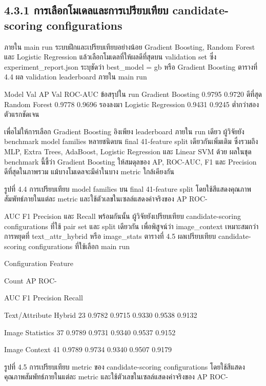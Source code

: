 \documentclass[12pt,a4paper]{report}
\begin{document}
\subsection*{4.3.1 การเลือกโมเดลและการเปรียบเทียบ candidate-scoring configurations}
ภายใน main run ระบบฝึกและเปรียบเทียบอย่างน้อย Gradient Boosting, Random Forest และ Logistic Regression แล้วเลือกโมเดลที่ให้ผลดีที่สุดบน validation set ซึ่ง experiment\_report.json ระบุชัดว่า best\_model = gb หรือ Gradient Boosting ตารางที่ 4.4 ผล validation leaderboard ภายใน main run\par
Model Val AP Val ROC-AUC ข้อสรุปใน run Gradient Boosting 0.9795 0.9720 ดีที่สุด Random Forest 0.9778 0.9696 รองลงมา Logistic Regression 0.9431 0.9245 ต่ำกว่าสองตัวแรกชัดเจน\par
\clearpage
เพื่อไม่ให้การเลือก Gradient Boosting อิงเพียง leaderboard ภายใน run เดียว ผู้วิจัยยัง benchmark model families หลายชนิดบน final 41-feature split เดียวกันเพิ่มเติม ซึ่งรวมถึง MLP, Extra Trees, AdaBoost, Logistic Regression และ Linear SVM ด้วย ผลในชุด benchmark นี้ชี้ว่า Gradient Boosting ให้สมดุลของ AP, ROC-AUC, F1 และ Precision ดีที่สุดในภาพรวม แม้บางโมเดลจะมีค่าในบาง metric ใกล้เคียงกัน\par
\begin{center}\small รูปที่ 4.4 การเปรียบเทียบ model families บน final 41-feature split โดยใช้สีแสดงคุณภาพสัมพัทธ์ภายในแต่ละ metric และใช้ตัวเลขในเซลล์แสดงค่าจริงของ AP ROC-\end{center}
AUC F1 Precision และ Recall พร้อมกันนั้น ผู้วิจัยยังเปรียบเทียบ candidate-scoring configurations ที่ใช้ pair set และ split เดียวกัน เพื่อพิสูจน์ว่า image\_context เหมาะสมกว่าการหยุดที่ text\_attr\_hybrid หรือ image\_stats ตารางที่ 4.5 ผลเปรียบเทียบ candidate-scoring configurations ที่ใช้เลือก main run\par
Configuration Feature\par
Count AP ROC-\par
AUC F1 Precision Recall\par
Text/Attribute Hybrid 23 0.9782 0.9715 0.9330 0.9538 0.9132\par
Image Statistics 37 0.9789 0.9731 0.9340 0.9537 0.9152\par
Image Context 41 0.9789 0.9734 0.9340 0.9507 0.9179\par
\clearpage
\begin{center}\small รูปที่ 4.5 การเปรียบเทียบ metric ของ candidate-scoring configurations โดยใช้สีแสดงคุณภาพสัมพัทธ์ภายในแต่ละ metric และใช้ตัวเลขในเซลล์แสดงค่าจริงของ AP ROC-\end{center}
\end{document}
